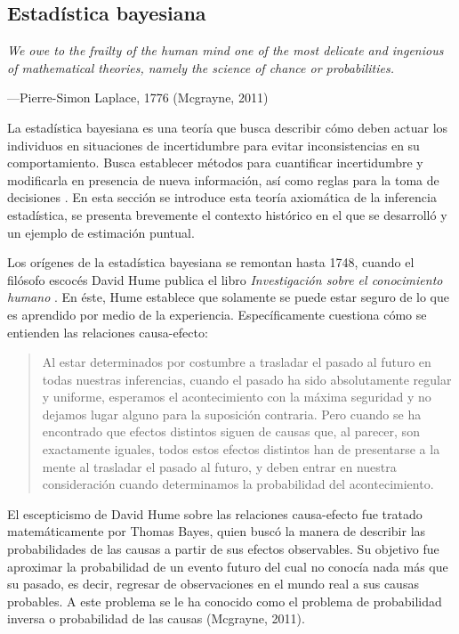 \documentclass[11pt,a4paper]{article}
\begin{document}
\subsection{Estadística bayesiana}
\label{sec:bayesiana}
\epigraph{\itshape We owe to the frailty of the human mind one of the most delicate and ingenious of mathematical theories, namely the science of chance or probabilities.}{---Pierre-Simon Laplace, 1776 (Mcgrayne, 2011)}

La estadística bayesiana es una teoría que busca describir cómo deben actuar los individuos en situaciones de incertidumbre para evitar inconsistencias en su comportamiento. Busca establecer métodos para cuantificar incertidumbre y modificarla en presencia de nueva información, así como reglas para la toma de decisiones \citep{bernardo}.  En esta sección se introduce esta teoría axiomática de la inferencia estadística, se presenta brevemente el contexto histórico en el que se desarrolló y un ejemplo de estimación puntual.

Los orígenes de la estadística bayesiana se remontan hasta 1748, cuando el filósofo escocés David Hume publica el libro \textit{Investigación sobre el conocimiento humano} \citep{hume}. En éste, Hume establece que solamente se puede estar seguro de lo que es aprendido por medio de la experiencia. Específicamente cuestiona cómo se entienden las relaciones causa-efecto:

\begin{quotation}
\noindent Al estar determinados por costumbre a trasladar el pasado al futuro en todas nuestras inferencias, cuando el pasado ha sido absolutamente regular y uniforme, esperamos el acontecimiento con la máxima seguridad y no dejamos lugar alguno para la suposición contraria. Pero cuando se ha encontrado que efectos distintos siguen de causas que, al parecer, son exactamente iguales, todos estos efectos distintos han de presentarse a la mente al trasladar el pasado al futuro, y deben entrar en nuestra consideración cuando determinamos la probabilidad del acontecimiento.
\end{quotation}

El escepticismo de David Hume sobre las relaciones causa-efecto fue tratado matemáticamente por Thomas Bayes, quien buscó la manera de describir las probabilidades de las causas a partir de sus efectos observables. Su objetivo fue aproximar la probabilidad de un evento futuro del cual no conocía nada más que su pasado, es decir, regresar de observaciones en el mundo real a sus causas probables. A este problema se le ha conocido como el problema de probabilidad inversa o probabilidad de las causas  (Mcgrayne, 2011).
\end{document}
